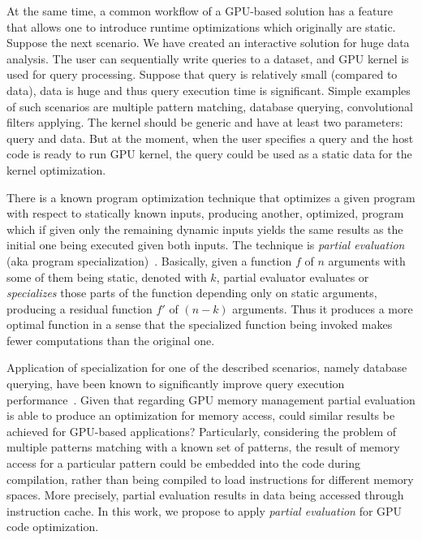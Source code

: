\documentclass[sigplan]{acmart}\settopmatter{}
\begin{document}
At the same time, a common workflow of a GPU-based solution has a feature that allows one to introduce runtime optimizations which originally are static.
Suppose the next scenario.
We have created an interactive solution for huge data analysis.
The user can sequentially write queries to a dataset, and GPU kernel is used for query processing.
Suppose that query is relatively small (compared to data), data is huge and thus query execution time is significant.
Simple examples of such scenarios are multiple pattern matching, database querying, convolutional filters applying.
The kernel should be generic and have at least two parameters: query and data.
But at the moment, when the user specifies a query and the host code is ready to run GPU kernel, the query could be used as a static data for the kernel optimization.

There is a known program optimization technique that optimizes a given program with respect to statically known inputs, producing another, optimized, program which if given only the remaining dynamic inputs yields the same results as the initial one being executed given both inputs.
The technique is \textit{partial evaluation} (aka program specialization)~\cite{Jones:1993:PEA:153676,PartialEvalPaper}.
Basically, given a function $f$ of $n$ arguments with some of them being static, denoted with $k$, partial evaluator evaluates or \textit{specializes} those parts of the function depending only on static arguments, producing a residual function $f'$ of $(n-k)$ arguments.
Thus it produces a more optimal function in a sense that the specialized function being invoked makes fewer computations than the original one.

Application of specialization for one of the described scenarios, namely database querying, have been known to significantly improve query execution performance~\cite{10.1007/978-3-319-74313-4_27}.
Given that regarding GPU memory management partial evaluation is able to produce an optimization for memory access, could similar results be achieved for GPU-based applications?
Particularly, considering the problem of multiple patterns matching with a known set of patterns, the result of memory access for a particular pattern could be embedded into the code during compilation, rather than being compiled to load instructions for different memory spaces.
More precisely, partial evaluation results in data being accessed through instruction cache.
In this work, we propose to apply \emph{partial evaluation} for GPU code optimization.
\end{document}
